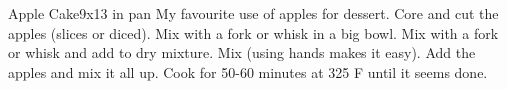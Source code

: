\begin{recipe}{Apple Cake}{9x13 in pan}{}
\freeform My favourite use of apples for dessert.
Core and cut the apples (slices or diced).
Mix with a fork or whisk in a big bowl.
Mix with a fork or whisk and add to dry mixture. Mix (using hands makes it easy).
Add the apples and mix it all up. Cook for 50-60 minutes at 325 F until it seems done.
\end{recipe}
